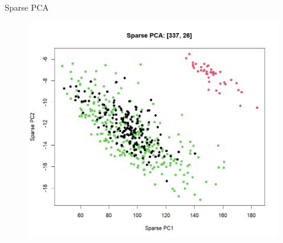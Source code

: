 \documentclass[12pt, aspectratio=43]{beamer}
\begin{document}
	
	
	\begin{frame}{Sparse PCA}
		\begin{figure}[h!]
			\centering
			\includegraphics[width=0.8\linewidth]{spca.png}
		\end{figure}
	\end{frame}
	
\end{document}
